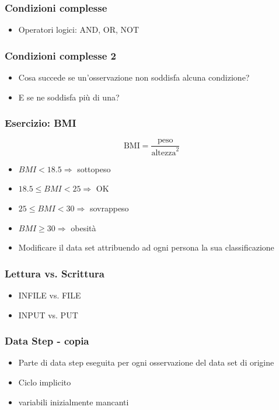 \begin{frame}[containsverbatim]\frametitle{Condizioni complesse}
  \begin{itemize}
  \item
    Operatori logici: AND, OR, NOT
  \end{itemize}
\end{frame}

\begin{frame}[containsverbatim]\frametitle{Condizioni complesse 2}
  \begin{itemize}
  \item
    Cosa succede se un'osservazione non soddisfa alcuna condizione?
  \item
    E se ne soddisfa pi{\`u} di una?
  \end{itemize}
\end{frame}



\begin{frame}\frametitle{Esercizio: BMI}
  $$\text{BMI} = \frac{\text{peso}}{\text{altezza}^2}$$
  \begin{itemize}
  \item
    $BMI < 18.5 \Rightarrow$ sottopeso
  \item
    $18.5 \le BMI < 25 \Rightarrow$ OK
  \item
    $25 \le BMI < 30 \Rightarrow$ sovrappeso
  \item
    $BMI \ge 30 \Rightarrow$ obesit{\`a}
  \item
    Modificare il data set attribuendo ad ogni persona la sua classificazione
  \end{itemize}\end{frame}






\begin{frame}\frametitle{Lettura vs. Scrittura}
\begin{itemize}
\item
INFILE vs. FILE
\item
INPUT vs. PUT
\end{itemize}
\end{frame}



\begin{frame}[fragile]\frametitle{Data Step - copia }
  \begin{itemize}
  \item
    Parte di data step eseguita per ogni osservazione del data set di origine
  \item
    Ciclo implicito
  \item variabili inizialmente mancanti
  \end{itemize}
\end{frame}

